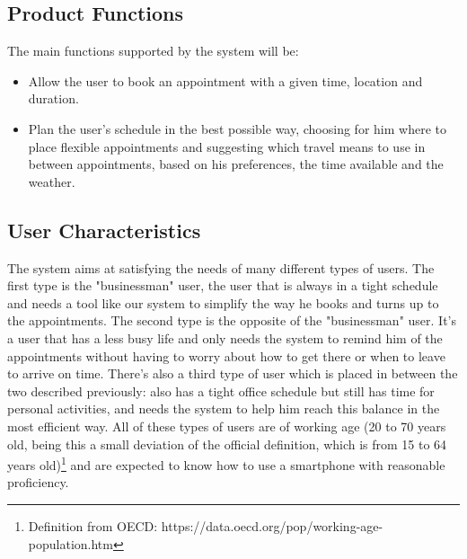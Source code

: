 \documentclass[12pt]{article}
\begin{document}
\subsection{Product Functions}
The main functions supported by the system will be:
\begin{itemize}
    \item Allow the user to book an appointment with a given time, location and duration.
    \item Plan the user's schedule in the best possible way, choosing for him where to place flexible appointments and suggesting which travel means to use in between appointments, based on his preferences, the time available and the weather.
\end{itemize}

\subsection{User Characteristics}
The system aims at satisfying the needs of many different types of users. The first type is the "businessman" user, the user that is always in a tight schedule and needs a tool like our system to simplify the way he books and turns up to the appointments. The second type is the opposite of the "businessman" user. It's a user that has a less busy life and only needs the system to remind him of the appointments without having to worry about how to get there or when to leave to arrive on time. There's also a third type of user which is placed in between the two described previously: also has a tight office schedule but still has time for personal activities, and needs the system to help him reach this balance in the most efficient way.
All of these types of users are of working age (20 to 70 years old, being this a small deviation of the official definition, which is from 15 to 64 years old)\footnote{Definition from OECD: https://data.oecd.org/pop/working-age-population.htm} and are expected to know how to use a smartphone with reasonable proficiency.
\end{document}
